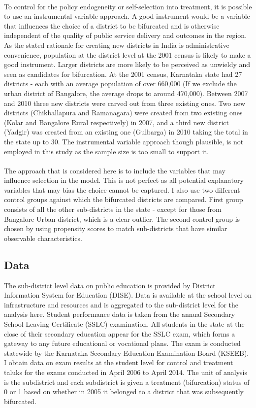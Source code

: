 \documentclass[12pt, a4paper]{article}
\begin{document}
\paragraph{} To control for the policy endogeneity or self-selection into treatment, it is possible to use an instrumental variable approach. A good instrument would be a variable that influences the choice of a district to be bifurcated and is otherwise independent of the quality of public service delivery and outcomes in the region. As the stated rationale for creating new districts in India is administrative convenience, population at the district level at the 2001 census is likely to make a good instrument. Larger districts are more likely to be perceived as unwieldy and seen as candidates for bifurcation. At the 2001 census, Karnataka state had 27 districts - each with an average population of over 660,000 (If we exclude the urban district of Bangalore, the average drops to around 470,000). Between 2007 and 2010 three new districts were carved out from three existing ones. Two new districts (Chikballapura and Ramanagara) were created from two existing ones (Kolar and Bangalore Rural respectively) in 2007, and a third new district (Yadgir) was created from an existing one (Gulbarga) in 2010 taking the total in the state up to 30. The instrumental variable approach though plausible, is not employed in this study as the sample size is too small to support it. 

\paragraph{}The approach that is considered here is to include the variables that may influence selection in the model. This is not perfect as all potential explanatory variables that may bias the choice cannot be captured. I also use two different control groups against which the bifurcated districts are compared. First group consists of all the other sub-districts in the state - except for those from Bangalore Urban district, which is a clear outlier. The second control group is chosen by using propensity scores to match sub-districts that have similar observable characteristics. 
\subsection*{Data}
The sub-district level data on public education is provided by District Information System for Education (DISE). Data is available at the school level on infrastructure and resources and is aggregated to the sub-district level for the analysis here. Student performance data is taken from the annual Secondary School Leaving Certificate (SSLC) examination. All students in the state at the close of their secondary education appear for the SSLC exam, which forms a gateway to any future educational or vocational plans. The exam is conducted statewide by the Karnataka Secondary Education Examination Board (KSEEB). I obtain data on exam results at the student level for control and treatment taluks for the exams conducted in April 2006 to April 2014. The unit of analysis is the subdistrict and each subdistrict is given a treatment (bifurcation) status of 0 or 1 based on whether in 2005 it belonged to a district that was subsequently bifurcated. 
\end{document}
